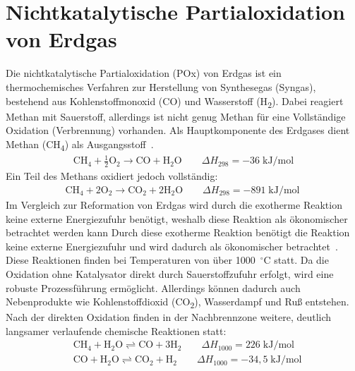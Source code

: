 \documentclass[footmark=none]{tubaf-thesis}
\begin{document}
        \section{Nichtkatalytische Partialoxidation von Erdgas}
            Die nichtkatalytische Partialoxidation (POx) von Erdgas ist ein thermochemisches Verfahren zur Herstellung von Synthesegas (Syngas), bestehend aus Kohlenstoffmonoxid (CO) und Wasserstoff (H\textsubscript{2}). Dabei reagiert Methan mit Sauerstoff, allerdings ist nicht genug Methan für eine Vollständige Oxidation (Verbrennung) vorhanden. Als Hauptkomponente des Erdgases dient Methan (CH\textsubscript{4}) als Ausgangsstoff~\cite{en16062916}.
            \begin{align}
                \mathrm{CH_4 + \frac{1}{2}O_2 \longrightarrow CO + H_2O} \qquad \Delta H_{298} = -36 \;\mathrm{kJ/mol}
            \end{align}
            Ein Teil des Methans oxidiert jedoch vollständig:
            \begin{align}
                \mathrm{CH_4 + 2O_2 \longrightarrow CO_2 + 2H_2O} \qquad \Delta H_{298} = -891 \;\mathrm{kJ/mol}~\label{eq:vollst_oxidation}
            \end{align}
            Im Vergleich zur Reformation von Erdgas wird durch die exotherme Reaktion keine externe Energiezufuhr benötigt, weshalb diese Reaktion als ökonomischer betrachtet werden kann \parencite[S. 6]{en16062916}
            Durch diese exotherme Reaktion benötigt die Reaktion keine externe Energiezufuhr und wird dadurch als ökonomischer betrachtet~\cite{en16062916}.\\
            Diese Reaktionen finden bei Temperaturen von über 1000~$^\circ$C statt. Da die Oxidation ohne Katalysator direkt durch Sauerstoffzufuhr erfolgt, wird eine robuste Prozessführung ermöglicht. Allerdings können dadurch auch Nebenprodukte wie Kohlenstoffdioxid (CO\textsubscript{2}), Wasserdampf und Ruß entstehen.\\
            Nach der direkten Oxidation finden in der Nachbrennzone weitere, deutlich langsamer verlaufende chemische Reaktionen statt:
            \begin{align}
                &\mathrm{CH_4 + H_2O \rightleftharpoons CO + 3H_2} \qquad \Delta H_{1000} = 226 \;\mathrm{kJ/mol}~\label{eq:dampfreformierung}\\
                &\mathrm{CO + H_2O \rightleftharpoons CO_2 + H_2} \qquad \Delta H_{1000} = -34,5 \;\mathrm{kJ/mol}
            \end{align}
\end{document}
